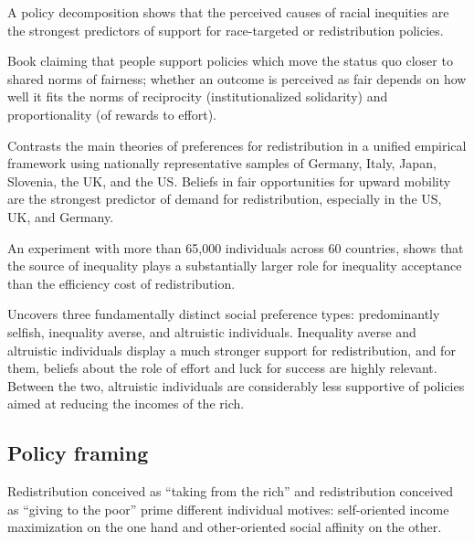 \documentclass{article}
\newcommand{\citem}[1]{\medskip \noindent \textbf{\cite*{#1}}}
\begin{document}
\citem{alesina2021perceptions}

A policy decomposition shows that the perceived causes of racial inequities are the strongest predictors of support for race-targeted or redistribution policies.

\citem{cavaille2023fair}

Book claiming that people support policies which move the status quo closer to shared norms of fairness; whether an outcome is perceived as fair depends on how well it fits the norms of reciprocity (institutionalized solidarity) and proportionality (of rewards to effort).

\citem{bonnet2025explains}

Contrasts the main theories of preferences for redistribution in a unified empirical framework using nationally representative samples of Germany, Italy, Japan, Slovenia, the UK, and the US. Beliefs in fair opportunities for upward mobility are the strongest predictor of demand for redistribution, especially in the US, UK, and Germany.

\citem{almaas2026fairness}

An experiment with more than 65,000 individuals across 60 countries, shows that the source of inequality plays a substantially larger role for inequality acceptance than the efficiency cost of redistribution.

\citem{fehr2026social}

Uncovers three fundamentally distinct social preference types: predominantly selfish, inequality
averse, and altruistic individuals. Inequality averse and altruistic individuals display a much stronger support for redistribution, and for them, beliefs about the role of effort and luck for success are highly relevant.  Between the two, altruistic individuals are considerably less supportive of policies aimed at reducing the incomes of the rich.

\subsection{Policy framing}

\citem{cavaille2015two}

Redistribution conceived as ``taking from the rich'' and redistribution conceived as ``giving to the poor'' prime different individual motives: self-oriented income maximization on the one hand and other-oriented social affinity on the other.
\end{document}
